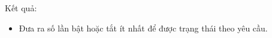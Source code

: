 Kết quả:  
\begin{itemize}
	\item     Đưa ra số lần bật hoặc tắt ít nhất để được trạng thái theo yêu cầu.   
\end{itemize}